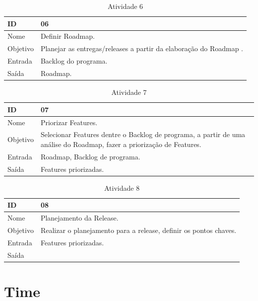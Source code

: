 \begin{table}[\htp]
\centering
\caption{Atividade 6}
\label{my-label}
\begin{tabular}{|l|l|}
\hline
ID       & 06                                               \\ \hline
Nome     & Definir Roadmap. \\ \hline
Objetivo & Planejar as entregas/releases a partir da elaboração do Roadmap .
 \\ \hline
Entrada  &  Backlog do programa. \\ \hline
Saída    & Roadmap. \\ \hline
\end{tabular}
\end{table}

\begin{table}[\htp]
\centering
\caption{Atividade 7}
\label{my-label}
\begin{tabular}{|l|l|}
\hline
ID       & 07                                               \\ \hline
Nome     & Priorizar Features. \\ \hline
Objetivo & Selecionar Features dentre o Backlog de programa, a partir de uma análise do Roadmap,  fazer a priorização de Features.
 \\ \hline
Entrada  &  Roadmap, Backlog de programa. \\ \hline
Saída    & Features priorizadas. \\ \hline
\end{tabular}
\end{table}

\begin{table}[\htp]
\centering
\caption{Atividade 8}
\label{my-label}
\begin{tabular}{|l|l|}
\hline
ID       & 08                                              \\ \hline
Nome     & Planejamento da Release. \\ \hline
Objetivo & Realizar o planejamento para a release, definir os pontos chaves.
 \\ \hline
Entrada  &  Features priorizadas. \\ \hline
Saída    & \\ \hline
\end{tabular}
\end{table}

\section{Time}

